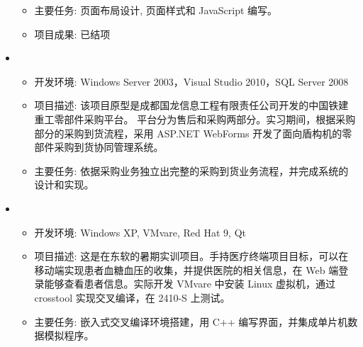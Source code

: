 \begin{itemize}[leftmargin=*]
{\begin{itemize}
      \item 主要任务: 页面布局设计, 页面样式和 JavaScript 编写。
      \item 项目成果: 已结项
    \end{itemize}
    }
    \item
    {\small
    \begin{itemize}
      \item 开发环境: Windows Server 2003，Visual Studio 2010，SQL Server 2008
      \item 项目描述: 该项目原型是成都国龙信息工程有限责任公司开发的中国铁建重工零部件采购平台。 平台分为售后和采购两部分。实习期间，根据采购部分的采购到货流程，采用 ASP.NET WebForms 开发了面向盾构机的零部件采购到货协同管理系统。
      \item 主要任务: 依据采购业务独立出完整的采购到货业务流程，并完成系统的设计和实现。
    \end{itemize}
    }
    \item {}
    {\small
    \begin{itemize}
      \item 开发环境: Windows XP, VMvare, Red Hat 9, Qt
      \item 项目描述: 这是在东软的暑期实训项目。手持医疗终端项目目标，可以在移动端实现患者血糖血压的收集，并提供医院的相关信息，在 Web 端登录能够查看患者信息。实际开发 VMvare 中安装 Linux 虚拟机，通过 crosstool 实现交叉编译，在 2410-S 上测试。
      \item 主要任务: 嵌入式交叉编译环境搭建，用 C++ 编写界面，并集成单片机数据模拟程序。
    \end{itemize}
    }
  \end{itemize}
